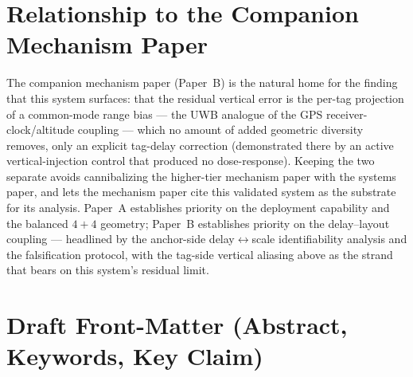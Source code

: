 \documentclass[11pt,a4paper]{article}
\begin{document}
\section{Relationship to the Companion Mechanism Paper}

The companion mechanism paper (Paper~B) is the natural home for the finding that this system
surfaces: that the residual vertical error is the per-tag projection of a common-mode range bias ---
the UWB analogue of the GPS receiver-clock/altitude coupling --- which no amount of added geometric
diversity removes, only an explicit tag-delay correction (demonstrated there by an active vertical-injection control that produced no dose-response). Keeping the two
separate avoids cannibalizing the higher-tier mechanism paper with the systems paper, and lets the
mechanism paper cite this validated system as the substrate for its analysis. Paper~A establishes
priority on the deployment capability and the balanced $4{+}4$ geometry; Paper~B establishes
priority on the delay--layout coupling --- headlined by the anchor-side delay$\leftrightarrow$scale
identifiability analysis and the falsification protocol, with the tag-side vertical aliasing above as
the strand that bears on this system's residual limit.

\section*{Draft Front-Matter (Abstract, Keywords, Key Claim)}
\end{document}
